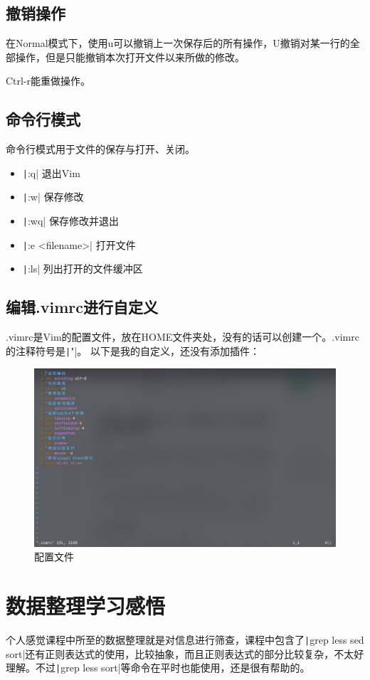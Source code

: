 \documentclass[fontset=ubuntu]{ctexart}
\begin{document}
\begin{sloppypar}
\subsection{撤销操作}
在Normal模式下，使用u可以撤销上一次保存后的所有操作，U撤销对某一行的全部操作，但是只能撤销本次打开文件以来所做的修改。

Ctrl-r能重做操作。

\subsection{命令行模式}
命令行模式用于文件的保存与打开、关闭。
\begin{itemize}
    \item \texttt|:q| 退出Vim
    \item \texttt|:w| 保存修改
    \item \texttt|:wq| 保存修改并退出
    \item \texttt|:e <filename>| 打开文件
    \item \texttt|:ls| 列出打开的文件缓冲区
\end{itemize}

\subsection{编辑.vimrc进行自定义}
.vimrc是Vim的配置文件，放在HOME文件夹处，没有的话可以创建一个。.vimrc的注释符号是\texttt|"|。
以下是我的自定义，还没有添加插件：
\begin{figure}[htb]
    \centering
    \includegraphics[width=0.75\linewidth]{.vimrc.png}
    \caption{配置文件}
    \label{fig:.vimrc}
\end{figure}

\section{数据整理学习感悟}
个人感觉课程中所至的数据整理就是对信息进行筛查，课程中包含了\texttt|grep less sed sort|还有正则表达式的使用，比较抽象，而且正则表达式的部分比较复杂，不太好理解。不过\texttt|grep less sort|等命令在平时也能使用，还是很有帮助的。


\end{sloppypar}
\end{document}
